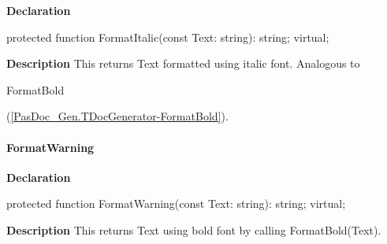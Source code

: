 \documentclass{report}
\newif\ifpdf
\begin{document}
\label{PasDoc_Gen.TDocGenerator-FormatItalic}
\begin{list}{}{
\setlength{\itemindent}{0cm}
\setlength{\listparindent}{0cm}
\setlength{\leftmargin}{\evensidemargin}
\addtolength{\leftmargin}{\tmplength}
\settowidth{\labelsep}{X}
\addtolength{\leftmargin}{\labelsep}
\setlength{\labelwidth}{\tmplength}
}
\item[\textbf{Declaration}\hfill]
\ifpdf
\begin{flushleft}
\fi
\begin{ttfamily}
protected function FormatItalic(const Text: string): string; virtual;\end{ttfamily}

\ifpdf
\end{flushleft}
\fi

\par
\item[\textbf{Description}]
This returns Text formatted using italic font. Analogous to \begin{ttfamily}FormatBold\end{ttfamily}(\ref{PasDoc_Gen.TDocGenerator-FormatBold}).

\end{list}
\paragraph*{FormatWarning}\hspace*{\fill}

\label{PasDoc_Gen.TDocGenerator-FormatWarning}
\begin{list}{}{
\setlength{\itemindent}{0cm}
\setlength{\listparindent}{0cm}
\setlength{\leftmargin}{\evensidemargin}
\addtolength{\leftmargin}{\tmplength}
\settowidth{\labelsep}{X}
\addtolength{\leftmargin}{\labelsep}
\setlength{\labelwidth}{\tmplength}
}
\item[\textbf{Declaration}\hfill]
\ifpdf
\begin{flushleft}
\fi
\begin{ttfamily}
protected function FormatWarning(const Text: string): string; virtual;\end{ttfamily}

\ifpdf
\end{flushleft}
\fi

\par
\item[\textbf{Description}]
This returns Text using bold font by calling FormatBold(Text).

\end{list}
\end{document}
